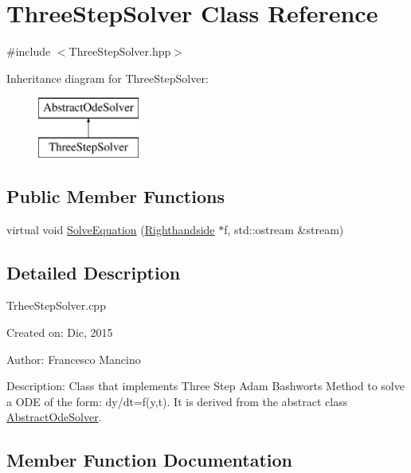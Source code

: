 \hypertarget{class_three_step_solver}{}\section{Three\+Step\+Solver Class Reference}
\label{class_three_step_solver}


{\ttfamily \#include $<$Three\+Step\+Solver.\+hpp$>$}

Inheritance diagram for Three\+Step\+Solver\+:\begin{figure}[H]
\begin{center}
\leavevmode
\includegraphics[height=2.000000cm]{class_three_step_solver}
\end{center}
\end{figure}
\subsection*{Public Member Functions}
\begin{DoxyCompactItemize}
\item 
virtual void \hyperlink{class_three_step_solver_a5c84debbe6e3497ab3c4b796e1f92cee}{Solve\+Equation} (\hyperlink{class_righthandside}{Righthandside} $\ast$f, std\+::ostream \&stream)
\end{DoxyCompactItemize}


\subsection{Detailed Description}
Trhee\+Step\+Solver.\+cpp

Created on\+: Dic, 2015 \begin{DoxyVerb}Author: Francesco Mancino
\end{DoxyVerb}


Description\+: Class that implements Three Step Adam Bashworts Method to solve a O\+D\+E of the form\+: dy/dt=f(y,t). It is derived from the abstract class \hyperlink{class_abstract_ode_solver}{Abstract\+Ode\+Solver}. 

\subsection{Member Function Documentation}
\hypertarget{class_three_step_solver_a5c84debbe6e3497ab3c4b796e1f92cee}{}
